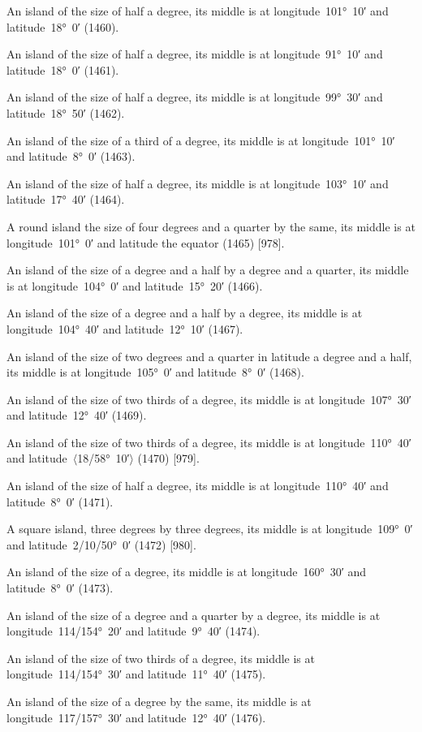 \documentclass[11pt]{article}
\newcommand{\Pg}[1]{\marginpar{\footnotesize #1}}
\newcommand{\Ang}[1]{\ensuremath{#1}}
\begin{document}
An island of the size of half a degree, its middle is at longitude~101°~10′ and latitude~18°~0′ (1460).

An island of the size of half a degree, its middle is at longitude~91°~10′ and latitude~18°~0′ (1461).

An island of the size of half a degree, its middle is at longitude~99°~30′ and latitude~18°~50′ (1462).

An island of the size of a third of a degree, its middle is at longitude~101°~10′ and latitude~8°~0′ (1463).

An island of the size of half a degree, its middle is at longitude~103°~10′ and latitude~17°~40′ (1464).

A round island the size of four degrees and a quarter by the same, its middle is at longitude~101°~0′ and latitude the equator (1465) [978].

An island of the size of a degree and a half by a degree and a quarter, its middle is at longitude~104°~0′ and latitude~15°~20′ (1466)\Pg{p. 96}.

An island of the size of a degree and a half by a degree, its middle is at longitude~104°~40′ and latitude~12°~10′ (1467).

An island of the size of two degrees and a quarter in latitude a degree and a half, its middle is at longitude~105°~0′ and latitude~8°~0′ (1468).

An island of the size of two thirds of a degree, its middle is at longitude~107°~30′ and latitude~12°~40′ (1469).

An island of the size of two thirds of a degree, its middle is at longitude~110°~40′ and latitude~\Ang{\langle}18/58°~10′\Ang{\rangle} (1470) [979].

An island of the size of half a degree, its middle is at longitude~110°~40′ and latitude~8°~0′ (1471).

A square island, three degrees by three degrees, its middle is at longitude~109°~0′ and latitude~2/10/50°~0′ (1472) [980].

An island of the size of a degree, its middle is at longitude~160°~30′ and latitude~8°~0′ (1473).

An island of the size of a degree and a quarter by a degree, its middle is at longitude~114/154°~20′ and latitude~9°~40′ (1474).

An island of the size of two thirds of a degree, its middle is at longitude~114/154°~30′ and latitude~11°~40′ (1475).

An island of the size of a degree by the same, its middle is at longitude~117/157°~30′ and latitude~12°~40′ (1476).
\end{document}
